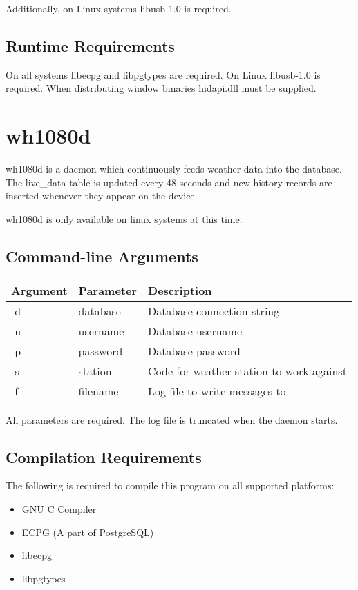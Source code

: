 \documentclass[a4paper,10pt,draft]{book}
\begin{document}
Additionally, on Linux systems libusb-1.0 is required.

\section{Runtime Requirements}
On all systems libecpg and libpgtypes are required. On Linux libusb-1.0 is required. When distributing window binaries hidapi.dll must be supplied.

\chapter{wh1080d}
wh1080d is a daemon which continuously feeds weather data into the database. The live\_data table is updated every 48 seconds and new history records are inserted whenever they appear on the device.

wh1080d is only available on linux systems at this time.

\section{Command-line Arguments}
\begin{tabular}{l l p{10cm}}
\hline
\textbf{Argument} & \textbf{Parameter} & \textbf{Description} \\
\hline
-d & database & Database connection string \\
-u & username & Database username \\
-p & password & Database password \\
-s & station  & Code for weather station to work against \\
-f & filename & Log file to write messages to \\
\hline
\end{tabular}

All parameters are required. The log file is truncated when the daemon starts.

\section{Compilation Requirements}
The following is required to compile this program on all supported platforms:
\begin{itemize}
\item GNU C Compiler
\item ECPG (A part of PostgreSQL)
\item libecpg
\item libpgtypes
\end{itemize}
\end{document}
